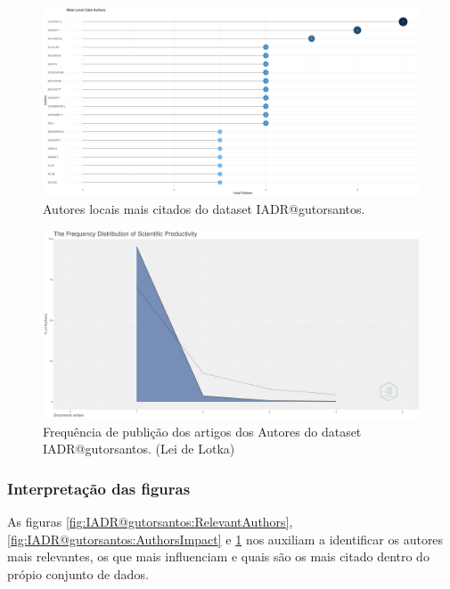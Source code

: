 \begin{figure}[H]
    \centering
\includegraphics[angle=0,width=1\textwidth]{experiments/gutorsantos/AnaliseBibliometrica/IAeDiscriminacao/imgs/MostLocalCitedAuthors-2022-02-09.png}
    \caption{Autores locais mais citados do dataset IADR@gutorsantos.}
    \label{fig:IADR@gutorsantos:MostCitedAuthors}
\end{figure}

\begin{figure}[H]
    \centering
    \includegraphics[angle=0,width=1\textwidth]{experiments/gutorsantos/AnaliseBibliometrica/IAeDiscriminacao/imgs/LotkaLaw-2022-02-09.png}
    \caption{Frequência de publição dos artigos dos Autores do dataset IADR@gutorsantos. (Lei de Lotka)}
    \label{fig:IADR@gutorsantos:Lotka}
\end{figure}

\subsubsection{Interpretação das figuras }
As figuras \ref{fig:IADR@gutorsantos:RelevantAuthors}, \ref{fig:IADR@gutorsantos:AuthorsImpact} e \ref{fig:IADR@gutorsantos:MostCitedAuthors} nos auxiliam a identificar os autores mais relevantes, os que mais influenciam e quais são os mais citado dentro do própio conjunto de dados.

